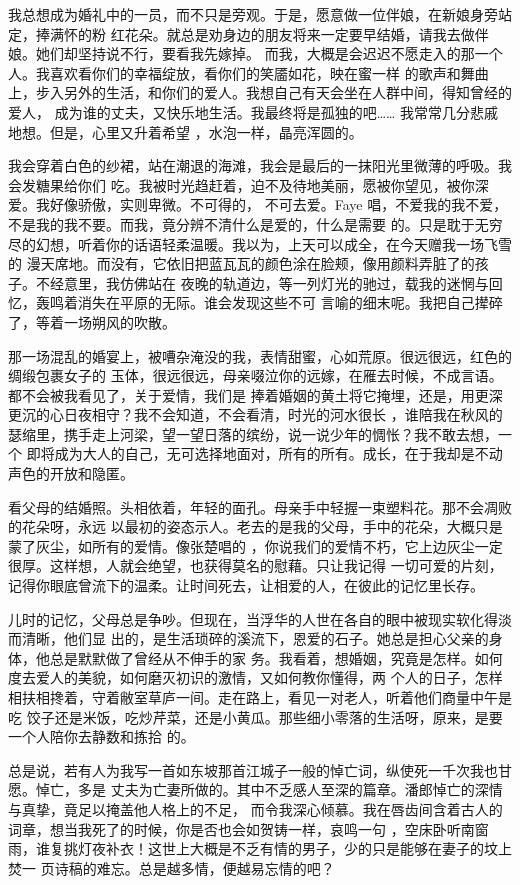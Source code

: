 \documentclass[12pt,a4paper]{article}
\begin{document}
		我总想成为婚礼中的一员，而不只是旁观。于是，愿意做一位伴娘，在新娘身旁站定，捧满怀的粉
	红花朵。就总是劝身边的朋友将来一定要早结婚，请我去做伴娘。她们却坚持说不行，要看我先嫁掉。
	而我，大概是会迟迟不愿走入的那一个人。我喜欢看你们的幸福绽放，看你们的笑靥如花，映在蜜一样
	的歌声和舞曲上，步入另外的生活，和你们的爱人。我想自己有天会坐在人群中间，得知曾经的爱人，
	成为谁的丈夫，又快乐地生活。我最终将是孤独的吧…… 我常常几分悲戚地想。但是，心里又升着希望
	，水泡一样，晶亮浑圆的。


		我会穿着白色的纱裙，站在潮退的海滩，我会是最后的一抹阳光里微薄的呼吸。我会发糖果给你们
	吃。我被时光趋赶着，迫不及待地美丽，愿被你望见，被你深爱。我好像骄傲，实则卑微。不可得的，
	不可去爱。Faye 唱，不爱我的我不爱，不是我的我不要。而我，竟分辨不清什么是爱的，什么是需要
	的。只是耽于无穷尽的幻想，听着你的话语轻柔温暖。我以为，上天可以成全，在今天赠我一场飞雪的
	漫天席地。而没有，它依旧把蓝瓦瓦的颜色涂在脸颊，像用颜料弄脏了的孩子。不经意里，我仿佛站在
	夜晚的轨道边，等一列灯光的驰过，载我的迷惘与回忆，轰鸣着消失在平原的无际。谁会发现这些不可
	言喻的细末呢。我把自己撵碎了，等着一场朔风的吹散。


		那一场混乱的婚宴上，被嘈杂淹没的我，表情甜蜜，心如荒原。很远很远，红色的绸缎包裹女子的
	玉体，很远很远，母亲啜泣你的远嫁，在雁去时候，不成言语。都不会被我看见了，关于爱情，我们是
	捧着婚姻的黄土将它掩埋，还是，用更深更沉的心日夜相守？我不会知道，不会看清，时光的河水很长
	，谁陪我在秋风的瑟缩里，携手走上河梁，望一望日落的缤纷，说一说少年的惆怅？我不敢去想，一个
	即将成为大人的自己，无可选择地面对，所有的所有。成长，在于我却是不动声色的开放和隐匿。


		看父母的结婚照。头相依着，年轻的面孔。母亲手中轻握一束塑料花。那不会凋败的花朵呀，永远
	以最初的姿态示人。老去的是我的父母，手中的花朵，大概只是蒙了灰尘，如所有的爱情。像张楚唱的
	，你说我们的爱情不朽，它上边灰尘一定很厚。这样想，人就会绝望，也获得莫名的慰藉。只让我记得
	一切可爱的片刻，记得你眼底曾流下的温柔。让时间死去，让相爱的人，在彼此的记忆里长存。


		儿时的记忆，父母总是争吵。但现在，当浮华的人世在各自的眼中被现实软化得淡而清晰，他们显
	出的，是生活琐碎的溪流下，恩爱的石子。她总是担心父亲的身体，他总是默默做了曾经从不伸手的家
	务。我看着，想婚姻，究竟是怎样。如何度去爱人的美貌，如何磨灭初识的激情，又如何教你懂得，两
	个人的日子，怎样相扶相搀着，守着敝室草庐一间。走在路上，看见一对老人，听着他们商量中午是吃
	饺子还是米饭，吃炒芹菜，还是小黄瓜。那些细小零落的生活呀，原来，是要一个人陪你去静数和拣拾
	的。


		总是说，若有人为我写一首如东坡那首江城子一般的悼亡词，纵使死一千次我也甘愿。悼亡，多是
	丈夫为亡妻所做的。其中不乏感人至深的篇章。潘郎悼亡的深情与真挚，竟足以掩盖他人格上的不足，
	而令我深心倾慕。我在唇齿间含着古人的词章，想当我死了的时候，你是否也会如贺铸一样，哀鸣一句
	，空床卧听南窗雨，谁复挑灯夜补衣！这世上大概是不乏有情的男子，少的只是能够在妻子的坟上焚一
	页诗稿的难忘。总是越多情，便越易忘情的吧？
\end{document}
